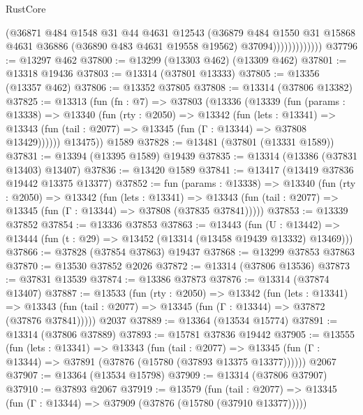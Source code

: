 \begin{lexlean}{RustCore}
\begin{coremodule}
                          (@36871
                            @484
                            @1548
                            @31
                            @44
                            @4631
                            @12543
                            (@36879
                              @484
                              @1550
                              @31
                              @15868
                              @4631
                              @36886
                              (@36890 @483 @4631 @19558 @19562)
                              @37094)))))))))))))
@37796 := @13297 @462
@37800 := @13299 (@13303 @462) (@13309 @462)
@37801 := @13318 @19436
@37803 := @13314 (@37801 @13333)
@37805 := @13356 (@13357 @462)
@37806 := @13352 @37805
@37808 := @13314 (@37806 @13382)
@37825 := @13313
    (fun (fn : @7) =>
    @37803
      (@13336
        (@13339
          (fun (params : @13338) =>
          @13340
            (fun (rty : @2050) =>
            @13342
              (fun (lets : @13341) =>
              @13343 (fun (tail : @2077) => @13345 (fun (Γ : @13344) => @37808 @13429))))))
        @13475))
    @1589
@37828 := @13481 (@37801 (@13331 @1589))
@37831 := @13394 (@13395 @1589) @19439
@37835 := @13314 (@13386 (@37831 @13403) @13407)
@37836 := @13420 @1589
@37841 := @13417 (@13419 @37836 @19442 @13375 @13377)
@37852 := fun (params : @13338) =>
  @13340
    (fun (rty : @2050) =>
    @13342
      (fun (lets : @13341) =>
      @13343 (fun (tail : @2077) => @13345 (fun (Γ : @13344) => @37808 (@37835 @37841)))))
@37853 := @13339 @37852
@37854 := @13336 @37853
@37863 := @13443
    (fun (U : @13442) => @13444 (fun (t : @29) => @13452 (@13314 (@13458 @19439 @13332) @13469)))
@37866 := @37828 (@37854 @37863) @19437
@37868 := @13299 @37853 @37863
@37870 := @13530 @37852 @2026
@37872 := @13314 (@37806 @13536)
@37873 := @37831 @13539
@37874 := @13386 @37873
@37876 := @13314 (@37874 @13407)
@37887 := @13533
    (fun (rty : @2050) =>
    @13342
      (fun (lets : @13341) =>
      @13343 (fun (tail : @2077) => @13345 (fun (Γ : @13344) => @37872 (@37876 @37841)))))
    @2037
@37889 := @13364 (@13534 @15774)
@37891 := @13314 (@37806 @37889)
@37893 := @15781 @37836 @19442
@37905 := @13555
    (fun (lets : @13341) =>
    @13343
      (fun (tail : @2077) =>
      @13345 (fun (Γ : @13344) => @37891 (@37876 (@15780 (@37893 @13375 @13377))))))
    @2067
@37907 := @13364 (@13534 @15798)
@37909 := @13314 (@37806 @37907)
@37910 := @37893 @2067
@37919 := @13579
    (fun (tail : @2077) => @13345 (fun (Γ : @13344) => @37909 (@37876 (@15780 (@37910 @13377)))))

\end{coremodule}
\end{lexlean}
